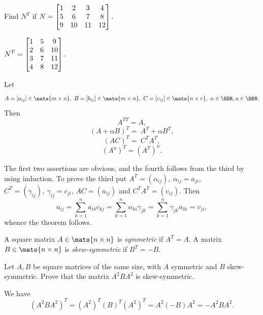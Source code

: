 \begin{exer}
Find $N^T$ if  $\displaystyle N = \begin{bmatrix}
1&2&3&4 \cr 
5&6&7&8\cr 
9&10&11&12 \cr \end{bmatrix}.$ 
\vspace*{2in}
\begin{answer}
$\displaystyle N^T = \begin{bmatrix}
1&5&9\cr
2&6&10\cr
3&7&11\cr
4&8&12\cr\end{bmatrix}.$
\end{answer}
\end{exer}

\begin{thm}\label{thm:properties_transpose}
Let $$A = [a_{ij}] \in \mats{m\times n},\  B = [b_{ij}] \in
\mats{m\times n},\  C = [c_{ij}] \in \mats{n\times r},\ \alpha \in \BBR, u\in\BBN .$$
Then
\begin{equation} A^{TT} = A,\end{equation}
\begin{equation} (A + \alpha B)^T =\  A^T + \alpha B^T,\end{equation}
\begin{equation} (AC)^T =\   C^TA^T,\end{equation}
\begin{equation} (A^{u})^T = (A^T)^u.\end{equation}

\begin{pf}
The first two assertions are obvious, and the fourth follows from
the third by using induction. To prove the third put $A^T =
(\alpha_{ij}), \ \alpha _{ij} = a_{ji}$, $C^T = (\gamma_{ij}), \
\gamma _{ij} = c_{ji}$, $AC = (u_{ij})$ and $C^TA^T = (v_{ij})$.
Then
$$u_{ij} = \sum _{k = 1} ^n a_{ik}c_{kj} = \sum _{k = 1} ^n \alpha _{ki}\gamma _{jk} =
\sum _{k = 1} ^n \gamma _{jk}\alpha _{ki} = v_{ji},$$ whence the
theorem follows.
\end{pf}
\end{thm}

\begin{df} 
A square matrix $A\in\mats{n\times n}$ is {\em symmetric} if
$A^T = A.$ A matrix $B\in\mats{n\times n}$ is {\em
skew-symmetric} if $B^T = -B.$
\end{df}


\begin{exa} Let $A, B$ be square matrices of the same size, with $A$
symmetric and $B$ skew-symmetric. Prove that the matrix $A^2BA^2$ is
skew-symmetric.
\begin{sol} We have
$$(A^2BA^2)^T = (A^2)^T (B)^T(A^2)^T = A^2(-B)A^2 = -A^2BA^2.$$
\end{sol} 
\end{exa} 

